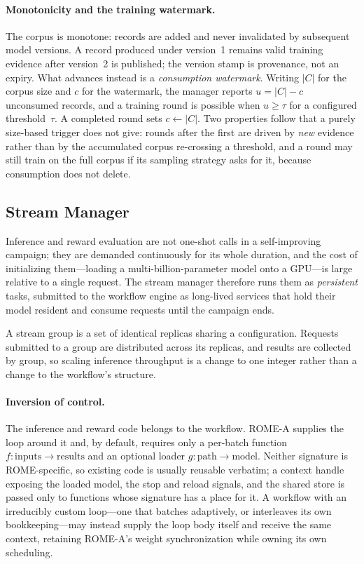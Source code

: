 \paragraph{Monotonicity and the training watermark.}
The corpus is monotone: records are added and never invalidated by subsequent
model versions. A record produced under version~1 remains valid training
evidence after version~2 is published; the version stamp is provenance, not an
expiry. What advances instead is a \emph{consumption watermark}. Writing $|C|$
for the corpus size and $c$ for the watermark, the manager reports
$u = |C| - c$ unconsumed records, and a training round is possible when
$u \geq \tau$ for a configured threshold~$\tau$. A completed round sets
$c \leftarrow |C|$. Two properties follow that a purely size-based trigger does
not give: rounds after the first are driven by \emph{new} evidence rather than
by the accumulated corpus re-crossing a threshold, and a round may still train
on the full corpus if its sampling strategy asks for it, because consumption
does not delete.

\subsection{Stream Manager}
\label{sec:design:stream}

Inference and reward evaluation are not one-shot calls in a self-improving
campaign; they are demanded continuously for its whole duration, and the cost of
initializing them---loading a multi-billion-parameter model onto a GPU---is
large relative to a single request. The stream manager therefore runs them as
\emph{persistent} tasks, submitted to the workflow engine as long-lived services
that hold their model resident and consume requests until the campaign ends.

A stream group is a set of identical replicas sharing a configuration. Requests
submitted to a group are distributed across its replicas, and results are
collected by group, so scaling inference throughput is a change to one integer
rather than a change to the workflow's structure.

\paragraph{Inversion of control.}
The inference and reward code belongs to the workflow. ROME-A supplies the loop
around it and, by default, requires only a per-batch function
$f: \text{inputs} \rightarrow \text{results}$ and an optional loader
$g: \text{path} \rightarrow \text{model}$. Neither signature is ROME-specific,
so existing code is usually reusable verbatim; a context handle exposing the
loaded model, the stop and reload signals, and the shared store is passed only
to functions whose signature has a place for it. A workflow with an
irreducibly custom loop---one that batches adaptively, or interleaves its own
bookkeeping---may instead supply the loop body itself and receive the same
context, retaining ROME-A's weight synchronization while owning its own
scheduling.

